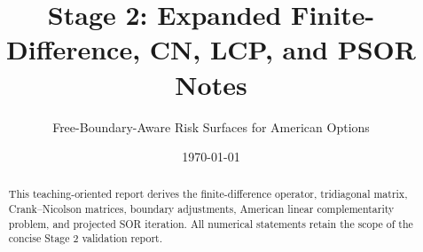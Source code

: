 \documentclass[11pt]{article}
\title{Stage 2: Expanded Finite-Difference, CN, LCP, and PSOR Notes}
\author{Free-Boundary-Aware Risk Surfaces for American Options}
\date{\today}
\begin{document}
\maketitle
\begin{abstract}
This teaching-oriented report derives the finite-difference operator,
tridiagonal matrix, Crank--Nicolson matrices, boundary adjustments, American
linear complementarity problem, and projected SOR iteration. All numerical
statements retain the scope of the concise Stage 2 validation report.
\end{abstract}

\tableofcontents
\newpage

\end{document}
